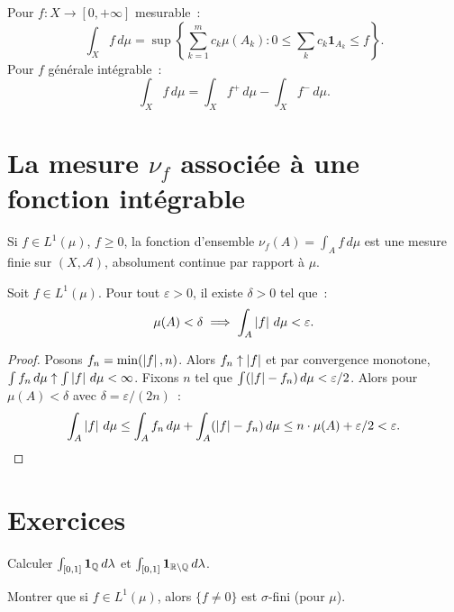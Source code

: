 \begin{formules}[title=\textbf{Int\'egrale de Lebesgue --- R\'esum\'e}]
Pour $f : X \to [0, +\infty]$ mesurable~:
\[
\int_X f\, d\mu = \sup\left\{\sum_{k=1}^m c_k \mu(A_k) :
0 \leq \sum_k c_k \mathbf{1}_{A_k} \leq f\right\}.
\]
Pour $f$ g\'en\'erale int\'egrable~:
\[
\int_X f\, d\mu = \int_X f^+\, d\mu - \int_X f^-\, d\mu.
\]
\end{formules}

\section{La mesure $\nu_f$ associ\'ee \`a une fonction int\'egrable}

\begin{proposition}
Si $f \in L^1(\mu)$, $f \geq 0$, la fonction d'ensemble
$\nu_f(A) = \int_A f\, d\mu$ est une mesure finie sur $(X, \mathcal{A})$,
absolument continue par rapport \`a $\mu$.
\end{proposition}

\begin{proposition}
Soit $f \in L^1(\mu)$. Pour tout $\varepsilon > 0$, il existe $\delta > 0$ tel que~:
\[
\mu(A) < \delta \implies \int_A \left| f \right|\, d\mu < \varepsilon.
\]
\end{proposition}

\begin{proof}
Posons $f_n = \min(\left| f \right|, n)$. Alors $f_n \uparrow \left| f \right|$ et par convergence
monotone, $\int f_n\, d\mu \uparrow \int \left| f \right|\, d\mu < \infty$. Fixons $n$ tel
que $\int (\left| f \right| - f_n)\, d\mu < \varepsilon/2$. Alors pour $\mu(A) < \delta$
avec $\delta = \varepsilon/(2n)$~:
\[
\int_A \left| f \right|\, d\mu \leq \int_A f_n\, d\mu + \int_A (\left| f \right| - f_n)\, d\mu
\leq n \cdot \mu(A) + \varepsilon/2 < \varepsilon. \qedhere
\]
\end{proof}

\section{Exercices}

\begin{exercice}
Calculer $\int_{[0,1]} \mathbf{1}_{\mathbb{Q}}\, d\lambda$ et
$\int_{[0,1]} \mathbf{1}_{\mathbb{R} \setminus \mathbb{Q}}\, d\lambda$.
\end{exercice}

\begin{exercice}
Montrer que si $f \in L^1(\mu)$, alors $\{f \neq 0\}$ est $\sigma$-fini (pour $\mu$).
\end{exercice}

